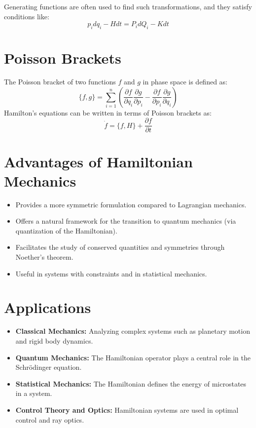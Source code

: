 Generating functions are often used to find such transformations, and they satisfy conditions like:
\[
p_i dq_i - H dt = P_i dQ_i - K dt
\]

\section{Poisson Brackets}
The Poisson bracket of two functions $f$ and $g$ in phase space is defined as:
\[
\{f, g\} = \sum_{i=1}^{n} \left( \frac{\partial f}{\partial q_i} \frac{\partial g}{\partial p_i} - \frac{\partial f}{\partial p_i} \frac{\partial g}{\partial q_i} \right)
\]
Hamilton's equations can be written in terms of Poisson brackets as:
\[
\dot{f} = \{f, H\} + \frac{\partial f}{\partial t}
\]

\section{Advantages of Hamiltonian Mechanics}
\begin{itemize}
    \item Provides a more symmetric formulation compared to Lagrangian mechanics.
    \item Offers a natural framework for the transition to quantum mechanics (via quantization of the Hamiltonian).
    \item Facilitates the study of conserved quantities and symmetries through Noether's theorem.
    \item Useful in systems with constraints and in statistical mechanics.
\end{itemize}

\section{Applications}
\begin{itemize}
    \item \textbf{Classical Mechanics:} Analyzing complex systems such as planetary motion and rigid body dynamics.
    \item \textbf{Quantum Mechanics:} The Hamiltonian operator plays a central role in the Schrödinger equation.
    \item \textbf{Statistical Mechanics:} The Hamiltonian defines the energy of microstates in a system.
    \item \textbf{Control Theory and Optics:} Hamiltonian systems are used in optimal control and ray optics.
\end{itemize}


